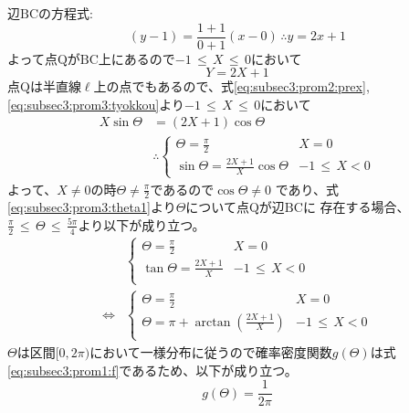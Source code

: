 \documentclass[dvipdfmx,titlepage, 11pt, a4paper]{jsarticle}%
\begin{document}
\begin{enumerate}[(1)]
    辺$\mathrm{BC}$の方程式:
    \begin{equation*}
        (y - 1) = \frac{1 + 1}{0 + 1}(x - 0)\, \therefore y = 2x + 1
    \end{equation*}
    よって点$\mathrm{Q}$が$\mathrm{BC}$上にあるので$-1\, \leq\, X\, \leq\, 0$において
    \begin{equation}
        Y = 2X + 1\label{eq:subsec3:prom3:tyokkou}
    \end{equation}
    点$\mathrm{Q}$は半直線$\ell$上の点でもあるので、式\eqref{eq:subsec3:prom2:prex}, \eqref{eq:subsec3:prom3:tyokkou}より$-1\, \leq\, X\, \leq\, 0$において
    \begin{align}
        X\sin\Theta &= \left(2X + 1\right)\cos\Theta\nonumber\\
        &\therefore
        \begin{cases}
            \Theta = \frac{\pi}{2} & X = 0\\
            \sin\Theta = \frac{2X + 1}{X}\cos\Theta & -1\, \leq\, X < 0
        \end{cases}\label{eq:subsec3:prom3:theta1}
    \end{align}
    よって、$X \neq 0$の時$\Theta \neq \frac{\pi}{2}$であるので$\cos\Theta \neq 0$
    であり、式\eqref{eq:subsec3:prom3:theta1}より$\Theta$について点$\mathrm{Q}$が辺$\mathrm{BC}$に
    存在する場合、$\frac{\pi}{2} \, \leq\, \Theta\, \leq\, \frac{5\pi}{4}$より以下が成り立つ。
    \begin{align}
        &\begin{cases}
            \Theta = \frac{\pi}{2} & X = 0\\
            \tan\Theta = \frac{2X + 1}{X} & -1\, \leq\, X < 0\\
        \end{cases}\nonumber\\
        \Longleftrightarrow&
        \begin{cases}
            \Theta = \frac{\pi}{2} & X = 0\\
            \Theta = \pi + \arctan\left(\frac{2X + 1}{X}\right) & -1\, \leq\, X < 0\\
        \end{cases}\label{eq:subsec3:prom3:theta2}
    \end{align}
    $\Theta$は区間$[0, 2\pi)$において一様分布に従うので確率密度関数$g(\Theta)$は式
    \eqref{eq:subsec3:prom1:f}であるため、以下が成り立つ。
    \begin{equation*}
        g(\Theta) = \frac{1}{2\pi}
    \end{equation*}

\end{enumerate}
\end{document}
